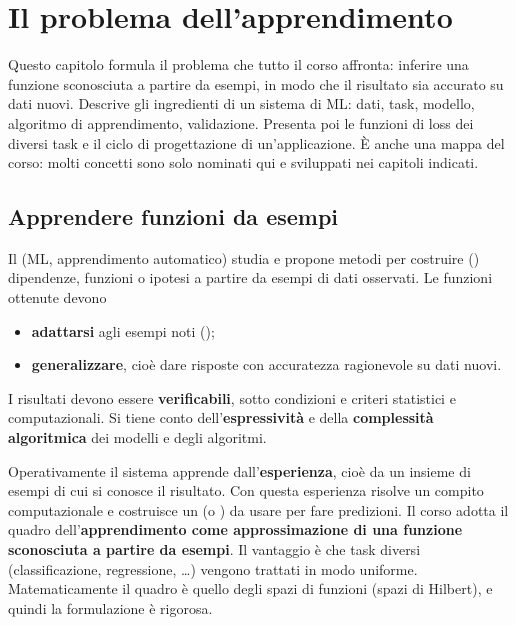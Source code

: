 \chapter{Il problema dell'apprendimento}
\label{cap:problema}

\begin{inbreve}
Questo capitolo formula il problema che tutto il corso affronta: inferire una funzione sconosciuta a partire da
esempi, in modo che il risultato sia accurato su dati nuovi. Descrive gli ingredienti di un sistema di ML: dati,
task, modello, algoritmo di apprendimento, validazione. Presenta poi le funzioni di loss dei diversi task e il ciclo
di progettazione di un'applicazione. È anche una mappa del corso: molti concetti sono solo nominati qui e
sviluppati nei capitoli indicati.
\end{inbreve}

\section{Apprendere funzioni da esempi}

\begin{definizione}
Il  (ML, apprendimento automatico) studia e propone metodi per costruire
() dipendenze, funzioni o ipotesi a partire da esempi di dati osservati. Le funzioni ottenute
devono
\begin{itemize}
  \item \textbf{adattarsi} agli esempi noti ();
  \item \textbf{generalizzare}, cioè dare risposte con accuratezza ragionevole su dati nuovi.
\end{itemize}
I risultati devono essere \textbf{verificabili}, sotto condizioni e criteri statistici e computazionali. Si tiene
conto dell'\textbf{espressività} e della \textbf{complessità algoritmica} dei modelli e degli algoritmi.
\end{definizione}

Operativamente il sistema apprende dall'\textbf{esperienza}, cioè da un insieme di esempi di cui si conosce il
risultato. Con questa esperienza risolve un compito computazionale e costruisce un  (o
) da usare per fare predizioni. Il corso adotta il quadro dell'\textbf{apprendimento come
approssimazione di una funzione sconosciuta a partire da esempi}. Il vantaggio è che task diversi
(classificazione, regressione, \dots) vengono trattati in modo uniforme. Matematicamente il quadro è quello degli
spazi di funzioni (spazi di Hilbert), e quindi la formulazione è rigorosa.


